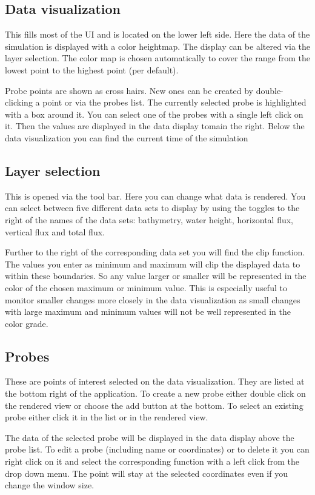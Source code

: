 \documentclass[paper=a4]{proc}
\begin{document}
			
		\subsection{Data visualization}
		This fills most of the UI and is located on the lower left side. Here the data of the simulation is displayed with a color heightmap. The display can be altered via the layer selection. The color map is chosen automatically to cover the range from the lowest point to the highest point (per default). 
		
		Probe points are shown as cross hairs. New ones can be created by double-clicking a point or via the probes list. The currently selected probe is highlighted with a box around it. You can select one of the probes with a single left click on it. Then the values are displayed in the data display tomain the right. Below the data visualization you can find the current time of the simulation
		\subsection{Layer selection}
		This is opened via the tool bar. Here you can change what data is rendered. You can select between five different data sets to display by using the toggles to the right of the names of the data sets: bathymetry, water height, horizontal flux, vertical flux and total flux. 
		
		Further to the right of the corresponding data set you will find the clip function. The values you enter as minimum and maximum will clip the displayed data to within these boundaries. So any value larger or smaller will be represented in the color of the chosen maximum or minimum value. This is especially useful to monitor smaller changes more closely in the data visualization as small changes with large maximum and minimum values will not be well represented in the color grade.
		\subsection{Probes}
		These are points of interest selected on the data visualization. They are listed at the bottom right of the application. To create a new probe either double click on the rendered view or choose the add button at the bottom. To select an existing probe either click it in the list or in the rendered view. 
		
		The data of the selected probe will be displayed in the data display above the probe list. To edit a probe (including name or coordinates) or to delete it you can right click on it and select the corresponding function with a left click from the drop down menu. The point will stay at the selected coordinates even if you change the window size. 
		
\end{document}
